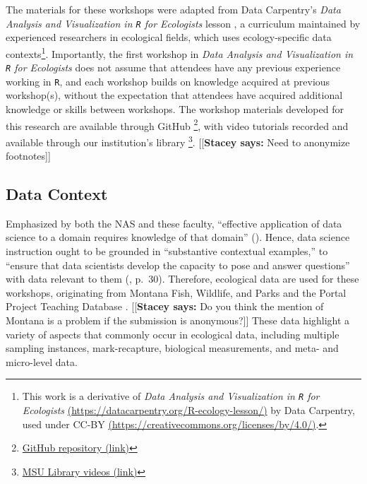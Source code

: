 \documentclass[12pt]{article}
\newcommand{\stacey}[1]{{\color{purple}[[\textbf{Stacey says: }#1]]}}
\begin{document}
\quad The materials for these workshops were adapted from Data Carpentry's 
\emph{Data Analysis and Visualization in \texttt{R} for Ecologists} lesson 
\citep{ecology_curriculum}, a curriculum maintained by experienced researchers
in ecological fields, which uses ecology-specific data contexts\footnote{This
work is a derivative of \emph{Data Analysis and Visualization in \texttt{R} for
Ecologists} \href{https://datacarpentry.org/R-ecology-lesson/}{(https://datacarpentry.org/R-ecology-lesson/)}
by Data Carpentry, used under CC-BY 
\href{https://creativecommons.org/licenses/by/4.0/}{(https://creativecommons.org/licenses/by/4.0/)}.}.
Importantly, the first workshop in \emph{Data Analysis and Visualization in 
\texttt{R} for Ecologists} does not assume that attendees have any previous
experience working in \texttt{R}, and each workshop builds on knowledge acquired
at previous workshop(s), without the expectation that attendees have acquired
additional knowledge or skills between workshops. The workshop materials
developed for this research are available through GitHub
\footnote{\href{https://github.com/atheobold/data-science-workshops-jse}{GitHub
repository (link)}}, with video tutorials recorded and available through our
institution's library 
\footnote{\href{http://bit.ly/ws_recordings}{MSU Library videos (link)}}. 
\stacey{Need to anonymize footnotes}

\subsection{Data Context}  

\quad Emphasized by both the NAS and these faculty, ``effective application of
data science to a domain requires knowledge of that domain'' (\citeyear[p.\ 29]{nas}). 
Hence, data science instruction ought to be grounded in ``substantive contextual
examples,'' to ``ensure that data scientists develop the capacity to pose and
answer questions'' with data relevant to them (\citeyear{nas}, p.\ 30). 
Therefore, ecological data are used for these workshops, originating from 
Montana Fish, Wildlife, and Parks and the Portal Project Teaching Database 
\citep{portal_data}.
\stacey{Do you think the mention of Montana is a problem if the submission
is anonymous?}
These data highlight a variety of aspects that
commonly occur in ecological data, including multiple sampling instances,
mark-recapture, biological measurements, and meta- and micro-level data. 
\end{document}
